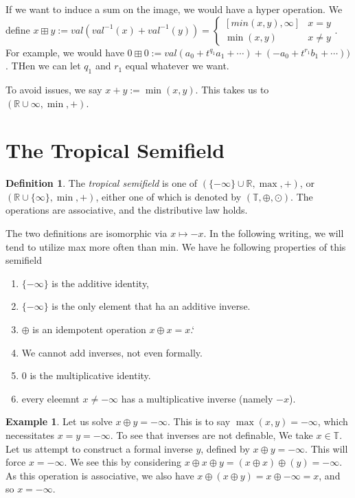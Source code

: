 \documentclass[11pt]{article}
\theoremstyle{definition}
\newtheorem{protoexample}{Example}[section]
\newenvironment{ex}
   {\begin{protoexample}}
   {\end{protoexample}}
\newtheorem{protodefinition}{Definition}[section]
\newenvironment{define}
   {\begin{protodefinition}}
   {\end{protodefinition}}
\def\RR{{\mathbb R}}
\begin{document}
If we want to induce a sum on the image, we would have a hyper operation. We define $x \boxplus y := val( val^{-1}(x) + val^{-1}(y) ) =\begin{cases} [min(x,y), \infty]  &x = y
\\
\min(x,y) & x \neq y\end{cases}$. For example, we would have $0 \boxplus 0 := val( a_0 +t^{q_1}a_1 + \cdots) + (-a_0 + t^{r_1}b_1 + \cdots ))$. THen we can let $q_1$ and $r_1$ equal whatever we want.

To avoid issues, we say $x+y := \min(x,y)$. This takes us to $(\RR \cup \infty, \min, +)$.

\section{The Tropical Semifield}

\begin{define}
    The \emph{tropical semifield} is one of $(\{- \infty\} \cup \RR, \max, +)$, or $(\RR \cup \{\infty\}, \min, +)$, either one of which is denoted by $(\mathbb{T}, \oplus, \odot)$. The operations are associative, and the distributive law holds.
\end{define}

The two definitions are isomorphic via $x \mapsto -x$. In the following writing, we will tend to utilize max more often than min. We have he following properties of this semifield

\begin{enumerate}
    \item $\{-\infty\}$ is the additive identity,
    \item $\{-\infty\}$ is the only element that ha an additive inverse.
    \item $\oplus$ is an idempotent operation $x \oplus x = x$.`
    \item We cannot add inverses, not even formally.
    \item $0$ is the multiplicative identity.
    \item every eleemnt $x \neq - \infty$ has a multiplicative inverse (namely $-x$).
\end{enumerate}

\begin{ex}
    Let us solve $x \oplus y = - \infty$. This is to say $\max(x,y) = - \infty$, which necessitates $x=y = -\infty$. To see that inverses are not definable, We take $x \in \mathbb{T}$. Let us attempt to construct a formal inverse $y$, defined by $x \oplus y = -\infty$. This will  force $x = -\infty$. We see this by considering $x \oplus x \oplus y= (x\oplus x) \oplus (y) = -\infty$. As this operation is associative, we also have $x \oplus (x \oplus y) = x \oplus - \infty = x$, and so $x= -\infty$.
\end{ex}
\end{document}
